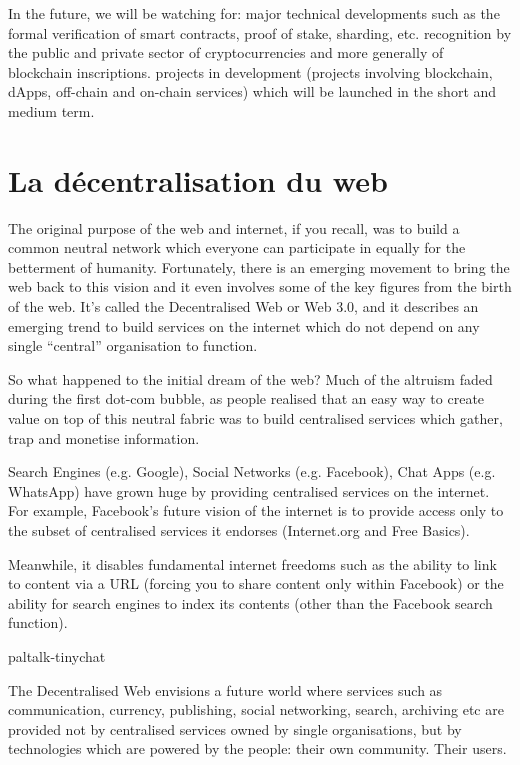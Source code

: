 \documentclass{tnreport}
\begin{document}
In the future, we will be watching for:
major technical developments such as the formal verification of smart contracts, proof of stake, sharding, etc.
recognition by the public and private sector of cryptocurrencies and more generally of blockchain inscriptions.
projects in development (projects involving blockchain, dApps, off-chain and on-chain services) which will be launched in the short and medium term.

\section{La décentralisation du web}

The original purpose of the web and internet, if you recall, was to build a common neutral network which everyone can participate in equally for the betterment of humanity. Fortunately, there is an emerging movement to bring the web back to this vision and it even involves some of the key figures from the birth of the web. It’s called the Decentralised Web or Web 3.0, and it describes an emerging trend to build services on the internet which do not depend on any single “central” organisation to function.

So what happened to the initial dream of the web? Much of the altruism faded during the first dot-com bubble, as people realised that an easy way to create value on top of this neutral fabric was to build centralised services which gather, trap and monetise information.

Search Engines (e.g. Google), Social Networks (e.g. Facebook), Chat Apps (e.g. WhatsApp) have grown huge by providing centralised services on the internet. For example, Facebook’s future vision of the internet is to provide access only to the subset of centralised services it endorses (Internet.org and Free Basics).

Meanwhile, it disables fundamental internet freedoms such as the ability to link to content via a URL (forcing you to share content only within Facebook) or the ability for search engines to index its contents (other than the Facebook search function).

paltalk-tinychat

The Decentralised Web envisions a future world where services such as communication, currency, publishing, social networking, search, archiving etc are provided not by centralised services owned by single organisations, but by technologies which are powered by the people: their own community. Their users.
\end{document}
